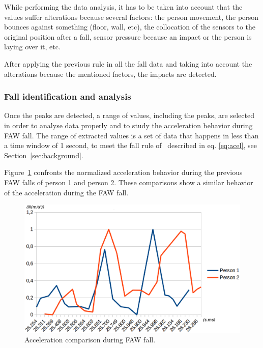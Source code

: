 \documentclass[10pt,journal,compsoc]{IEEEtran}
\begin{document}
While performing the data analysis, it has to be taken into account that the values suffer 
alterations because several factors: the person movement, the person bounces against something 
(floor, wall, etc), the collocation of the sensors to the original position after a fall, 
sensor pressure because an impact or the person is laying over it, etc.

After applying the previous rule in all the fall data and taking into account the alterations 
because the mentioned factors, the impacts are detected.

\subsubsection{Fall identification and analysis} Once the peaks are detected, a range of values, 
including the peaks, are selected in order to analyse data properly and to study the acceleration 
behavior during FAW fall. The range of extracted values is a set of data that happens in less 
than a time window of 1 second, to meet the fall rule of~\cite{Luder2009} described in eq. \ref{eq:acel}, see Section~\ref{sec:background}. 

%		

Figure~\ref{fig:FAWcomparison} confronts the normalized acceleration behavior during the previous FAW falls of person 1 and person 2. These comparisons show a similar behavior of the acceleration during the FAW fall.
\begin{figure}[!ht]
	\centering
	\includegraphics[scale=0.21]{Images/TwoFallsComparative.eps}
	\caption[Acceleration during FAW fall]{Acceleration comparison during FAW fall.}
	\label{fig:FAWcomparison}
\end{figure}
\end{document}
